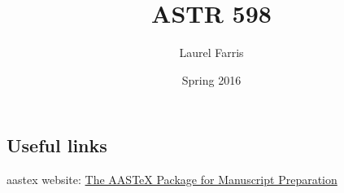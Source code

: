 \documentclass[12pt]{article}
\title{ASTR 598}
\author{Laurel Farris}
\date{Spring 2016}
\begin{document}
\maketitle

\subsection{Useful links}

aastex website: \textcolor{blue}
{\href{http://aas.org/aastex/aastex-package-manuscript-preparation}
{The AASTeX Package for Manuscript Preparation}}
\end{document}
